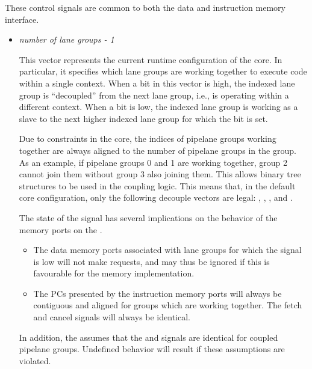 \documentclass[main.tex]{subfiles}
\begin{document}
These control signals are common to both the data and instruction memory interface.

\begin{itemize}
  
  \item {}\textit{number of lane groups - 1}
  
  This vector represents the current runtime configuration of the core. In particular, it specifies which lane groups are working together to execute code within a single context. When a bit in this vector is high, the indexed lane group is ``decoupled'' from the next lane group, i.e., is operating within a different context. When a bit is low, the indexed lane group is working as a slave to the next higher indexed lane group for which the bit is set.
  
  Due to constraints in the core, the indices of pipelane groups working together are always aligned to the number of pipelane groups in the group. As an example, if pipelane groups 0 and 1 are working together, group 2 cannot join them without group 3 also joining them. This allows binary tree structures to be used in the coupling logic. This means that, in the default core configuration, only the following decouple vectors are legal: , , ,  and .
  
  The state of the  signal has several implications on the behavior of the memory ports on the \rvex{}.
  
  \begin{itemize}
    
    \item The data memory ports associated with lane groups for which the  signal is low will not make requests, and may thus be ignored if this is favourable for the memory implementation.
    
    \item The PCs presented by the instruction memory ports will always be contiguous and aligned for groups which are working together. The fetch and cancel signals will always be identical.
    
  \end{itemize}
  
  In addition, the \rvex{} assumes that the  and  signals are identical for coupled pipelane groups. Undefined behavior will result if these assumptions are violated.
  

\end{itemize}
\end{document}
